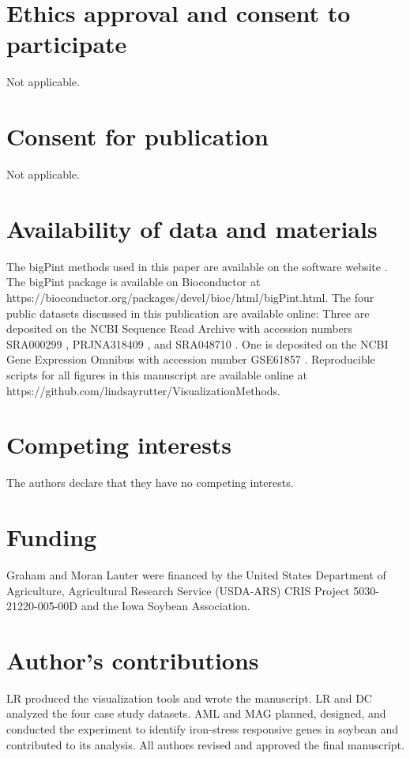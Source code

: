 \documentclass{bmcart}
\begin{document}
\begin{linenumbers}
\begin{backmatter}

\section*{Ethics approval and consent to participate}
  Not applicable.

\section*{Consent for publication}
  Not applicable.

\section*{Availability of data and materials}
  The bigPint methods used in this paper are available on the software website \cite{bigPint}. The bigPint package is available on Bioconductor at https://bioconductor.org/packages/devel/bioc/html/bigPint.html. The four public datasets discussed in this publication are available online: Three are deposited on the NCBI Sequence Read Archive with accession numbers SRA000299 \cite{Marioni}, PRJNA318409 \cite{Lauter16}, and SRA048710 \cite{Risso}. One is deposited on the NCBI Gene Expression Omnibus with accession number GSE61857 \cite{Brown}. Reproducible scripts for all figures in this manuscript are available online at https://github.com/lindsayrutter/VisualizationMethods.

\section*{Competing interests}
  The authors declare that they have no competing interests.

\section*{Funding}
  Graham and Moran Lauter were financed by the United States Department of Agriculture, Agricultural Research Service (USDA-ARS) CRIS Project 5030-21220-005-00D and the Iowa Soybean Association.

\section*{Author's contributions}
  LR produced the visualization tools and wrote the manuscript. LR and DC analyzed the four case study datasets. AML and MAG planned, designed, and conducted the experiment to identify iron-stress responsive genes in soybean and contributed to its analysis. All authors revised and approved the final manuscript.
    

\end{backmatter}
\end{linenumbers}
\end{document}
